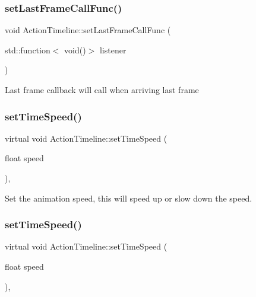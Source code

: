 \subsubsection{\texorpdfstring{set\+Last\+Frame\+Call\+Func()}{setLastFrameCallFunc()}\hspace{0.1cm}{\footnotesize\ttfamily [2/2]}}
{\footnotesize\ttfamily void Action\+Timeline\+::set\+Last\+Frame\+Call\+Func (\begin{DoxyParamCaption}\item[{std\+::function$<$ void()$>$}]{listener }\end{DoxyParamCaption})}

Last frame callback will call when arriving last frame \mbox{\label{classActionTimeline_a24ba56fd33efc2bc0d0a4fc31e4043d6}} 
\subsubsection{\texorpdfstring{set\+Time\+Speed()}{setTimeSpeed()}\hspace{0.1cm}{\footnotesize\ttfamily [1/2]}}
{\footnotesize\ttfamily virtual void Action\+Timeline\+::set\+Time\+Speed (\begin{DoxyParamCaption}\item[{float}]{speed }\end{DoxyParamCaption})\hspace{0.3cm}{\ttfamily [inline]}, {\ttfamily [virtual]}}

Set the animation speed, this will speed up or slow down the speed. \mbox{\label{classActionTimeline_a24ba56fd33efc2bc0d0a4fc31e4043d6}} 
\subsubsection{\texorpdfstring{set\+Time\+Speed()}{setTimeSpeed()}\hspace{0.1cm}{\footnotesize\ttfamily [2/2]}}
{\footnotesize\ttfamily virtual void Action\+Timeline\+::set\+Time\+Speed (\begin{DoxyParamCaption}\item[{float}]{speed }\end{DoxyParamCaption})\hspace{0.3cm}{\ttfamily [inline]}, {\ttfamily [virtual]}}

